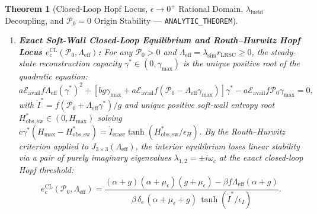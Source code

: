 \documentclass[11pt,a4paper]{article}
\newtheorem{theorem}{Theorem}
\theoremstyle{definition}
\begin{document}
\begin{theorem}[Closed-Loop Hopf Locus, $\epsilon \to 0^+$ Rational Domain, $\lambda_{\mathrm{lucid}}$ Decoupling, and $\mathcal{P}_0 = 0$ Origin Stability --- \texttt{ANALYTIC\_THEOREM}]
\begin{enumerate}
  \item \textbf{Exact Soft-Wall Closed-Loop Equilibrium and Routh--Hurwitz Hopf Locus $e_c^{\mathrm{CL}}(\mathcal{P}_0, \Lambda_{\mathrm{eff}})$:} For any $\mathcal{P}_0 > 0$ and $\Lambda_{\mathrm{eff}} = \lambda_{\mathrm{sim}}r_{\mathrm{LRSC}} \ge 0$, the steady-state reconstruction capacity $\gamma^* \in (0, \gamma_{\max})$ is the unique positive root of the quadratic equation:
  \begin{equation}
  \label{eq:closed_loop_quad}
  a\mathcal{E}_{\mathrm{avail}}f\Lambda_{\mathrm{eff}}(\gamma^*)^2 + \left[b g\gamma_{\max} + a\mathcal{E}_{\mathrm{avail}}f(\mathcal{P}_0 - \Lambda_{\mathrm{eff}}\gamma_{\max})\right]\gamma^* - a\mathcal{E}_{\mathrm{avail}}f\mathcal{P}_0\gamma_{\max} = 0,
  \end{equation}
  with $\dot{I}^* = f(\mathcal{P}_0 + \Lambda_{\mathrm{eff}}\gamma^*)/g$ and unique positive soft-wall entropy root $H_{\mathrm{obs},\mathrm{sw}}^* \in (0, H_{\max})$ solving $c\gamma^*(H_{\max} - H_{\mathrm{obs},\mathrm{sw}}^*) = \dot{I}_{\mathrm{erase}}\tanh(H_{\mathrm{obs},\mathrm{sw}}^*/\epsilon_H)$. By the Routh--Hurwitz criterion applied to $J_{3\times 3}(\Lambda_{\mathrm{eff}})$, the interior equilibrium loses linear stability via a pair of purely imaginary eigenvalues $\lambda_{1,2} = \pm i\omega_c$ at the exact closed-loop Hopf threshold:
  \begin{equation}
  \label{eq:ec_closed_loop}
  e_c^{\mathrm{CL}}(\mathcal{P}_0, \Lambda_{\mathrm{eff}}) = \frac{(\alpha + g)(\alpha + \mu_{\epsilon})(g + \mu_{\epsilon}) - \beta f\Lambda_{\mathrm{eff}}(\alpha + g)}{\beta\,\delta_{\epsilon}\,(\alpha + \mu_{\epsilon} + g)\,\tanh(\dot{I}^*/\epsilon_I)}.
  \end{equation}


\end{enumerate}
\end{theorem}
\end{document}
